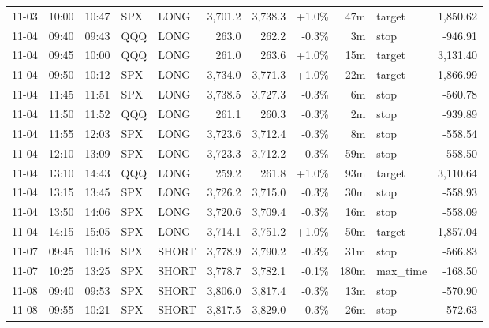 \documentclass[11pt,a4paper,twoside]{article}
\begin{document}
\begin{center}
\begin{longtable}{>{\color{txtmain}}l l l l l r r r r >{\color{txtmain}}l r}
11-03 & 10:00 & 10:47 & SPX & LONG & 3,701.2 & 3,738.3 & \textcolor{wingreen}{+1.0\%} & 47m & target & \textcolor{wingreen}{1,850.62} \\
11-04 & 09:40 & 09:43 & QQQ & LONG & 263.0 & 262.2 & \textcolor{lossred}{-0.3\%} & 3m & stop & \textcolor{lossred}{-946.91} \\
11-04 & 09:45 & 10:00 & QQQ & LONG & 261.0 & 263.6 & \textcolor{wingreen}{+1.0\%} & 15m & target & \textcolor{wingreen}{3,131.40} \\
11-04 & 09:50 & 10:12 & SPX & LONG & 3,734.0 & 3,771.3 & \textcolor{wingreen}{+1.0\%} & 22m & target & \textcolor{wingreen}{1,866.99} \\
11-04 & 11:45 & 11:51 & SPX & LONG & 3,738.5 & 3,727.3 & \textcolor{lossred}{-0.3\%} & 6m & stop & \textcolor{lossred}{-560.78} \\
11-04 & 11:50 & 11:52 & QQQ & LONG & 261.1 & 260.3 & \textcolor{lossred}{-0.3\%} & 2m & stop & \textcolor{lossred}{-939.89} \\
11-04 & 11:55 & 12:03 & SPX & LONG & 3,723.6 & 3,712.4 & \textcolor{lossred}{-0.3\%} & 8m & stop & \textcolor{lossred}{-558.54} \\
11-04 & 12:10 & 13:09 & SPX & LONG & 3,723.3 & 3,712.2 & \textcolor{lossred}{-0.3\%} & 59m & stop & \textcolor{lossred}{-558.50} \\
11-04 & 13:10 & 14:43 & QQQ & LONG & 259.2 & 261.8 & \textcolor{wingreen}{+1.0\%} & 93m & target & \textcolor{wingreen}{3,110.64} \\
11-04 & 13:15 & 13:45 & SPX & LONG & 3,726.2 & 3,715.0 & \textcolor{lossred}{-0.3\%} & 30m & stop & \textcolor{lossred}{-558.93} \\
11-04 & 13:50 & 14:06 & SPX & LONG & 3,720.6 & 3,709.4 & \textcolor{lossred}{-0.3\%} & 16m & stop & \textcolor{lossred}{-558.09} \\
11-04 & 14:15 & 15:05 & SPX & LONG & 3,714.1 & 3,751.2 & \textcolor{wingreen}{+1.0\%} & 50m & target & \textcolor{wingreen}{1,857.04} \\
11-07 & 09:45 & 10:16 & SPX & SHORT & 3,778.9 & 3,790.2 & \textcolor{lossred}{-0.3\%} & 31m & stop & \textcolor{lossred}{-566.83} \\
11-07 & 10:25 & 13:25 & SPX & SHORT & 3,778.7 & 3,782.1 & \textcolor{lossred}{-0.1\%} & 180m & max\_time & \textcolor{lossred}{-168.50} \\
11-08 & 09:40 & 09:53 & SPX & SHORT & 3,806.0 & 3,817.4 & \textcolor{lossred}{-0.3\%} & 13m & stop & \textcolor{lossred}{-570.90} \\
11-08 & 09:55 & 10:21 & SPX & SHORT & 3,817.5 & 3,829.0 & \textcolor{lossred}{-0.3\%} & 26m & stop & \textcolor{lossred}{-572.63} \\

\end{longtable}
\end{center}
\end{document}
